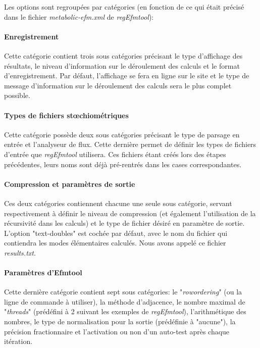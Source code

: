 Les options sont regroupées par catégories (en fonction de ce qui était précisé dans le fichier \textit{metabolic-efm.xml} de \textit{regEfmtool}):

\paragraph*{Enregistrement} Cette catégorie contient trois sous catégories précisant le type d'affichage des résultats, le niveau d'information sur le déroulement des calculs et le format d'enregistrement. Par défaut, l'affichage se fera en ligne sur le site et le type de message d'information sur le déroulement des calculs sera le plus complet possible. 

\paragraph*{Types de fichiers stœchiométriques} Cette catégorie possède deux sous catégories précisant le type de parsage en entrée et l'analyseur de flux. Cette dernière permet de définir les types de fichiers d'entrée que \textit{regEfmtool} utilisera. Ces fichiers étant créés lors des étapes précédentes, leurs noms sont déjà pré-rentrés dans les cases correspondantes.

\paragraph*{Compression et paramètres de sortie} Ces deux catégories contiennent chacune une seule sous catégorie, servant respectivement à définir le niveau de compression (et également l'utilisation de la récursivité dans les calculs) et le type de fichier désiré en paramètre de sortie. L'option "text-doubles" est cochée par défaut, avec le nom du fichier qui contiendra les modes élémentaires calculés. Nous avons appelé ce fichier \textit{results.txt}. 

\paragraph*{Paramètres d'Efmtool} Cette dernière catégorie contient sept sous catégories: le "\textit{rowordering}" (ou la ligne de commande à utiliser), la méthode d'adjacence, le nombre maximal de "\textit{threads}" (prédéfini à 2 suivant les exemples de \textit{regEfmtool}), l'arithmétique des nombres, le type de normalisation pour la sortie (prédéfinie à "aucune"), la précision fractionnaire et l'activation ou non d'un auto-test après chaque itération. \\

